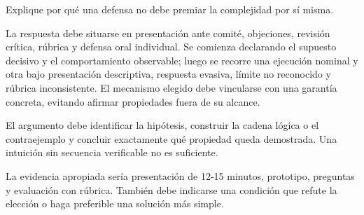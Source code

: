 \documentclass[variant=guia,cover=institutional,mode=screen]{ua-engineering-v6-article}
\begin{document}
\begin{uaexercise}
Explique por qué una defensa no debe premiar la complejidad por sí misma.
\end{uaexercise}
\begin{uaanswer}
La respuesta debe situarse en presentación ante comité, objeciones, revisión crítica, rúbrica y defensa oral individual. Se comienza declarando el supuesto decisivo y el comportamiento observable; luego se recorre una ejecución nominal y otra bajo presentación descriptiva, respuesta evasiva, límite no reconocido y rúbrica inconsistente. El mecanismo elegido debe vincularse con una garantía concreta, evitando afirmar propiedades fuera de su alcance.

El argumento debe identificar la hipótesis, construir la cadena lógica o el contraejemplo y concluir exactamente qué propiedad queda demostrada. Una intuición sin secuencia verificable no es suficiente.

La evidencia apropiada sería presentación de 12-15 minutos, prototipo, preguntas y evaluación con rúbrica. También debe indicarse una condición que refute la elección o haga preferible una solución más simple.
\end{uaanswer}
\end{document}
